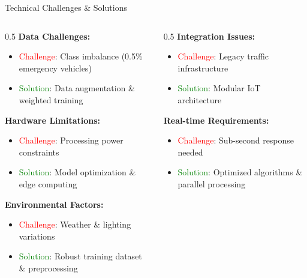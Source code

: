 \documentclass[10pt]{beamer}
\begin{document}
\begin{frame}{Technical Challenges \& Solutions}
    \begin{columns}
        \begin{column}{0.5\textwidth}
            \textbf{Data Challenges:}
            \begin{itemize}
                \item \textcolor{red}{Challenge}: Class imbalance (0.5\% emergency vehicles)
                \item \textcolor{green}{Solution}: Data augmentation \& weighted training
            \end{itemize}
            
            \vspace{0.2cm}
            \textbf{Hardware Limitations:}
            \begin{itemize}
                \item \textcolor{red}{Challenge}: Processing power constraints
                \item \textcolor{green}{Solution}: Model optimization \& edge computing
            \end{itemize}
            
            \vspace{0.2cm}
            \textbf{Environmental Factors:}
            \begin{itemize}
                \item \textcolor{red}{Challenge}: Weather \& lighting variations
                \item \textcolor{green}{Solution}: Robust training dataset \& preprocessing
            \end{itemize}
        \end{column}
        \begin{column}{0.5\textwidth}
            \textbf{Integration Issues:}
            \begin{itemize}
                \item \textcolor{red}{Challenge}: Legacy traffic infrastructure
                \item \textcolor{green}{Solution}: Modular IoT architecture
            \end{itemize}
            
            \vspace{0.2cm}
            \textbf{Real-time Requirements:}
            \begin{itemize}
                \item \textcolor{red}{Challenge}: Sub-second response needed
                \item \textcolor{green}{Solution}: Optimized algorithms \& parallel processing
            \end{itemize}
            

\end{column}
\end{columns}
\end{frame}
\end{document}
